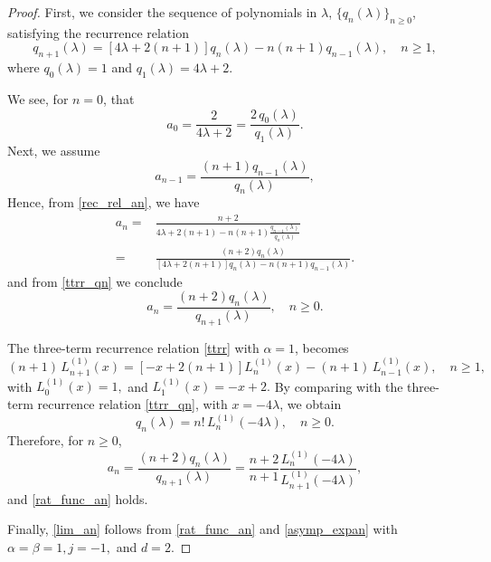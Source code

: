 \documentclass[10pt,a4paper]{amsart}
\begin{document}
\begin{proof}
First, we consider the sequence of polynomials in $\lambda$, $\{q_n(\lambda)\}_{n\geqslant 0}$, satisfying the recurrence relation
\begin{equation} \label{ttrr_qn}
q_{n+1}(\lambda) = [ 4\lambda +2(n+1)] q_{n}(\lambda) -n(n+1) q_{n-1}(\lambda), \quad n\geqslant 1,
\end{equation}
where  $q_{0}(\lambda) = 1 $ and $q_{1}(\lambda)= 4\lambda +2$.


We see, for $n=0$, that
$$
a_0 = \frac{2}{4 \lambda + 2} = \frac{2 \,q_{0}(\lambda)}{q_{1}(\lambda)}.
$$
Next, we assume
$$
a_{n-1} = \frac{(n+1) q_{n-1}(\lambda)}{q_{n}(\lambda)},
$$
Hence, from \eqref{rec_rel_an}, we have
\begin{align*}
a_n = &  \frac{n+2}{4 \lambda + 2(n+1) - n  (n+1)\frac{ q_{n-1}(\lambda)}{q_{n}(\lambda)}
} \\
= &  \frac{(n+2)q_{n}(\lambda)}{[4 \lambda + 2(n+1)]q_{n}(\lambda) - n  (n+1) q_{n-1}(\lambda)}.
\end{align*}
and from \eqref{ttrr_qn} we conclude
$$
a_n  = \frac{(n+2) q_{n}(\lambda)}{q_{n+1}(\lambda)}, \quad n\geqslant 0.
$$

The three-term recurrence relation \eqref{ttrr} with $\alpha =1$, becomes
$$ (n+1)\,L_{n+1}^{(1)}(x) = [-x+ 2(n+1) ]L_{n}^{(1)}(x) - (n+1) \,L_{n-1}^{(1)}(x), \quad n\geqslant 1,
$$
with $ L_{0}^{(1)}(x) =1, $ and $ L_{1}^{(1)}(x) = -x+2.$
By comparing  with the three-term recurrence relation \eqref{ttrr_qn}, with $x=-4\lambda$, we obtain
$$
q_n(\lambda) =  n! \, L_{n}^{(1)}(-4\lambda), \quad
n \geqslant 0.
$$
Therefore, for  $n\geqslant 0$,
$$
a_n  = \frac{(n+2) q_{n}(\lambda)}{q_{n+1}(\lambda)}
=  \frac{n+2}{n+1}
\frac{L^{(1)}_{n}(-4\lambda)}{L^{(1)}_{n+1}(-4\lambda)},
$$
and \eqref{rat_func_an} holds.

Finally, \eqref{lim_an} follows from \eqref{rat_func_an} and \eqref{asymp_expan}
with $\alpha = \beta = 1, j = -1,$ and $d=2$.
\end{proof}
\end{document}

